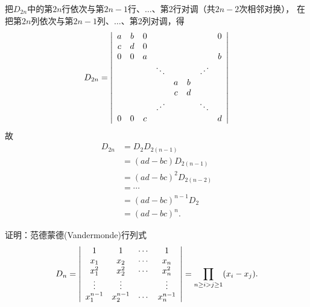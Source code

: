 \begin{frame} 
\begin{jie}
  把$D_{2n}$中的第$2n$行依次与第$2n-1$行、$\ldots$、第2行对调（共$2n-2$次相邻对换），
  在把第$2n$列依次与第$2n-1$列、$\ldots$、第2列对调，得
  $$
  D_{2n} = \left|
    \begin{array}{cccccccc}
      a & b & 0 &      & & & &0 \\
      c & d & 0 & & &  & &\\
      0 & 0 & a & & &  & & b \\
        &   &   & \ddots &  &  & \iddots &   \\
        &   &   &     & a& b& & \\
        &   &   &     & c& d& & \\
        &   &   & \iddots &  &  & \ddots &   \\
      0 & 0 & c & & &  & & d
    \end{array}
  \right|
  $$
  故
  $$
  \begin{aligned}
    D_{2n} & = D_2 D_{2(n-1)}  \\
    &= (ad-bc)D_{2(n-1)} \\
    &= (ad-bc)^2 D_{2(n-2)}\\
    &= \cdots \\
    &= (ad-bc)^{n-1}D_{2} \\
    &= (ad-bc)^n.      
  \end{aligned}
  $$
\end{jie}
%
\end{frame}

\begin{frame}
\begin{testexample}
  证明：范德蒙德(Vandermonde)行列式
  $$
  D_n = \left|
    \begin{array}{cccc}
      1        &  1        & \cdots &    1     \\                    
      x_1      &  x_2      & \cdots &    x_n    \\ 
      x_1^2    &  x_2^2     & \cdots &   x_n^2   \\ 
      \vdots      &  \vdots      &     &    \vdots      \\
      x_1^{n-1} & x_2^{n-1} &  \cdots &  x_n^{n-1}
    \end{array}
  \right|
  = \prod_{n \ge i > j \ge 1}(x_i-x_j).
  $$
\end{testexample}
\end{frame}

